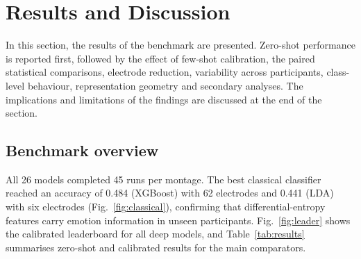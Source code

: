 \section{Results and Discussion}
In this section, the results of the benchmark are presented. Zero-shot performance is reported first, followed by the effect of few-shot calibration, the paired statistical comparisons, electrode reduction, variability across participants, class-level behaviour, representation geometry and secondary analyses. The implications and limitations of the findings are discussed at the end of the section.


\subsection{Benchmark overview}
All 26 models completed 45 runs per montage. The best classical classifier reached an accuracy of 0.484 (XGBoost) with 62 electrodes and 0.441 (LDA) with six electrodes (Fig.~\ref{fig:classical}), confirming that differential-entropy features carry emotion information in unseen participants. Fig.~\ref{fig:leader} shows the calibrated leaderboard for all deep models, and Table~\ref{tab:results} summarises zero-shot and calibrated results for the main comparators.

